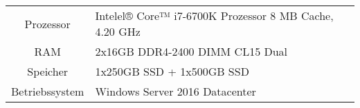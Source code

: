 \begin{tabularx}{\textwidth}{cXX}
Prozessor & Intelel® Core™ i7-6700K Prozessor 8 MB Cache, 4.20 GHz \\ 
\rowcolor{odd} RAM & 2x16GB DDR4-2400 DIMM CL15 Dual \\
Speicher & 1x250GB SSD + 1x500GB SSD \\ 
\rowcolor{odd} Betriebssystem & Windows Server 2016 Datacenter \\
\end{tabularx}
